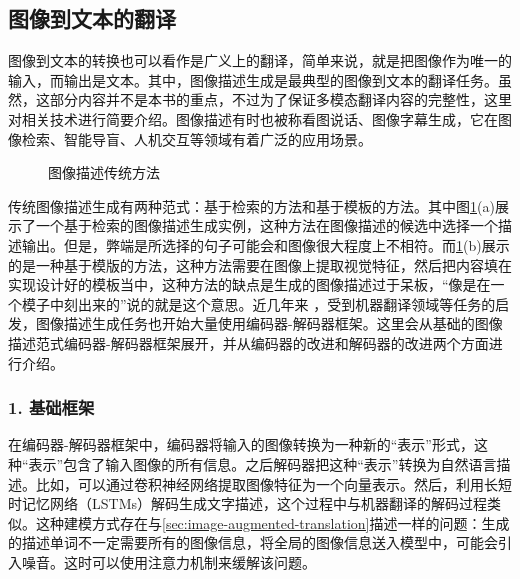 \subsection{图像到文本的翻译}

\parinterval 图像到文本的转换也可以看作是广义上的翻译，简单来说，就是把图像作为唯一的输入，而输出是文本。其中，图像描述生成是最典型的图像到文本的翻译任务。虽然，这部分内容并不是本书的重点，不过为了保证多模态翻译内容的完整性，这里对相关技术进行简要介绍。图像描述有时也被称看图说话、图像字幕生成，它在图像检索、智能导盲、人机交互等领域有着广泛的应用场景。

\begin{figure}[htp]
\centering

\caption{图像描述传统方法}
\label{fig:17-15}
\end{figure}

\parinterval 传统图像描述生成有两种范式：基于检索的方法和基于模板的方法。其中图\ref{fig:17-15}(a)展示了一个基于检索的图像描述生成实例，这种方法在图像描述的候选中选择一个描述输出。但是，弊端是所选择的句子可能会和图像很大程度上不相符。而\ref{fig:17-15}(b)展示的是一种基于模版的方法，这种方法需要在图像上提取视觉特征，然后把内容填在实现设计好的模板当中，这种方法的缺点是生成的图像描述过于呆板，“像是在一个模子中刻出来的”说的就是这个意思。近几年来 ，受到机器翻译领域等任务的启发，图像描述生成任务也开始大量使用编码器-解码器框架。这里会从基础的图像描述范式编码器-解码器框架展开，并从编码器的改进和解码器的改进两个方面进行介绍。


\subsubsection{1. 基础框架}

\parinterval 在编码器-解码器框架中，编码器将输入的图像转换为一种新的“表示”形式，这种“表示”包含了输入图像的所有信息。之后解码器把这种“表示”转换为自然语言描述。比如，可以通过卷积神经网络提取图像特征为一个向量表示。然后，利用长短时记忆网络（LSTMs）解码生成文字描述，这个过程中与机器翻译的解码过程类似。这种建模方式存在与\ref{sec:image-augmented-translation}描述一样的问题：生成的描述单词不一定需要所有的图像信息，将全局的图像信息送入模型中，可能会引入噪音。这时可以使用注意力机制来缓解该问题。

